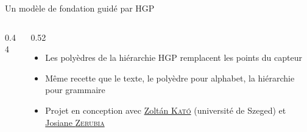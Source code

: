 \documentclass[A4,svgnames,10pt,aspectratio=169,usepdftitle=false]{beamer}
\begin{document}
\begin{frame}{Un modèle de fondation guidé par HGP}
    \begin{columns}[c,onlytextwidth]
        \begin{column}{0.44\textwidth}
            \centering
            \resizebox{\textwidth}{!}{}
        \end{column}
        \begin{column}{0.52\textwidth}
            \begin{itemize}
                \setlength{\itemsep}{6pt}
                \item Les polyèdres de la hiérarchie HGP remplacent les points du capteur
                \item Même recette que le texte, le polyèdre pour alphabet, la hiérarchie pour grammaire
                \item Projet en conception avec \href{https://www.inf.u-szeged.hu/~kato/}{Zoltán \textsc{Kató}} (université de Szeged) et \href{https://www-sop.inria.fr/members/Josiane.Zerubia/index.html}{Josiane \textsc{Zerubia}}
            \end{itemize}
        \end{column}
    \end{columns}
\end{frame}

\begin{frame}
    \merci
\end{frame}
\end{document}
